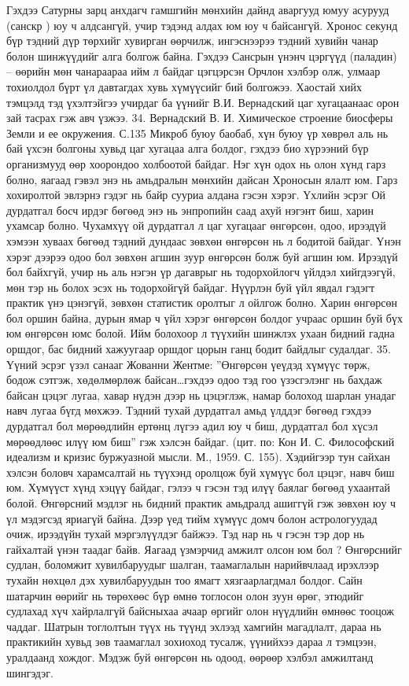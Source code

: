 Гэхдээ Сатурны зарц анхдагч гамшгийн мөнхийн дайнд аваргууд юмуу асурууд (санскр ) юу ч алдсангүй, учир тэдэнд алдах юм юу ч байсангүй. Хронос секунд бүр тэдний дүр төрхийг хувирган өөрчилж, ингэснээрээ тэдний хувийн чанар болон шинжүүдийг алга болгож байна. Гэхдээ Сансрын үнэнч цэргүүд (паладин) – өөрийн мөн чанараараа ийм л байдаг цэгцэрсэн Орчлон хэлбэр олж, улмаар тохиолдол бүрт үл давтагдах хувь хүмүүсийг бий болгожээ. Хаостай хийх тэмцэлд тэд үхэлтэйгээ учирдаг ба үүнийг В.И. Вернадский цаг хугацаанаас орон зай тасрах гэж авч үзжээ. 34. Вернадский В. И. Химическое строение биосферы Земли и ее окружения. С.135
Микроб буюу баобаб, хүн буюу үр хөврөл аль нь бай үхсэн болгоны хувьд цаг хугацаа алга болдог, гэхдээ био хүрээний бүр организмууд өөр хоорондоо холбоотой байдаг. Нэг хүн одох нь олон хүнд гарз болно, яагаад гэвэл энэ нь амьдралын мөнхийн дайсан Хроносын ялалт юм. Гарз хохиролтой эвлэрнэ гэдэг нь байр сууриа алдана гэсэн хэрэг. Үхлийн эсрэг Ой дурдатгал босч ирдэг бөгөөд энэ нь энпропийн саад ахуй нэгэнт биш, харин ухамсар болно. Чухамхүү ой дурдатгал л цаг хугацааг өнгөрсөн, одоо, ирээдүй хэмээн хуваах бөгөөд тэдний дундаас зөвхөн өнгөрсөн нь л бодитой байдаг.
Үнэн хэрэг дээрээ одоо бол зөвхөн агшин зуур өнгөрсөн болж буй агшин юм. Ирээдүй бол байхгүй, учир нь аль нэгэн үр дагаврыг нь тодорхойлогч үйлдэл хийгдээгүй, мөн тэр нь болох эсэх нь тодорхойгүй байдаг. Нүүрлэн буй үйл явдал гэдэгт практик үнэ цэнэгүй, зөвхөн статистик оролтыг л ойлгож болно. Харин өнгөрсөн бол оршин байна, дурын ямар ч үйл хэрэг өнгөрсөн болдог учраас оршин буй бүх юм өнгөрсөн юмс болой. Ийм болохоор л түүхийн шинжлэх ухаан бидний гадна оршдог, бас бидний хажуугаар оршдог цорын ганц бодит байдлыг судалдаг.
35. Үүний эсрэг үзэл санааг Жованни Жентме: ”Өнгөрсөн үеүдэд хүмүүс төрж, бодож сэтгэж, хөдөлмөрлөж байсан…гэхдээ одоо тэд гоо үзэсгэлэнг нь бахдаж байсан цэцэг лугаа, хавар нүдэн дээр нь цэцэглэж, намар болоход шарлан унадаг навч лугаа бүгд мөхжээ. Тэдний тухай дурдатгал амьд үлддэг бөгөөд гэхдээ дурдатгал бол мөрөөдлийн ертөнц лүгээ адил юу ч биш, дурдатгал бол хүсэл мөрөөдлөөс илүү юм биш” гэж хэлсэн байдаг. (цит. по: Кон И. С. Философский идеализм и кризис буржуазной мысли. М., 1959. С. 155). Хэдийгээр тун сайхан хэлсэн боловч харамсалтай нь түүхэнд оролцож буй хүмүүс бол цэцэг, навч биш юм. Хүмүүст хүнд хэцүү байдаг, гэлээ ч гэсэн тэд илүү баялаг бөгөөд ухаантай болой.
Өнгөрсний мэдлэг нь бидний практик амьдралд ашиггүй гэж зөвхөн юу ч үл мэдэгсэд яриагүй байна. Дээр үед тийм хүмүүс домч болон астрологуудад очиж, ирээдүйн тухай мэргэлүүлдэг байжээ. Тэд нар нь ч гэсэн тэр дор нь гайхалтай үнэн таадаг байв. Яагаад үзмэрчид амжилт олсон юм бол ? Өнгөрснийг судлан, боломжит хувилбаруудыг шалган, таамаглалын нарийвчлаад ирэхлээр тухайн нөхцөл дэх хувилбаруудын тоо ямагт хязгаарлагдмал болдог. Сайн шатарчин өөрийг нь төрөхөөс бүр өмнө тоглосон олон зуун өрөг, этюдийг судлахад хүч хайрлалгүй байсныхаа ачаар өргийг олон нүүдлийн өмнөөс тооцож чаддаг. Шатрын тоглолтын түүх нь түүнд эхлээд хамгийн магадлалт, дараа нь практикийн хувьд зөв таамаглал зохиоход тусалж, үүнийхээ дараа л тэмцээн, уралдаанд хождог. Мэдэж буй өнгөрсөн нь одоод, өөрөөр хэлбэл амжилтанд шингэдэг.
